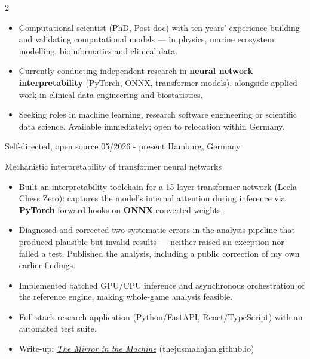 \documentclass{thejus_cv}
\begin{document}
\begin{paracol}{2}


\begin{itemize}[label=\textbullet, leftmargin=1em]
    \item Computational scientist (PhD, Post-doc) with ten years' experience building and validating computational models --- in physics, marine ecosystem modelling, bioinformatics and clinical data.
    \item Currently conducting independent research in \textbf{neural network interpretability} (PyTorch, ONNX, transformer models), alongside applied work in clinical data engineering and biostatistics.
    \item Seeking roles in machine learning, research software engineering or scientific data science. Available immediately; open to relocation within Germany.
\end{itemize}


             {Self-directed, open source}
             {05/2026 - present}
             {Hamburg, Germany}
             {Mechanistic interpretability of transformer neural networks
             \begin{itemize}\setlength{\itemsep}{0.05em}
                   \item Built an interpretability toolchain for a 15-layer transformer network (Leela Chess Zero): captures the model's internal attention during inference via \textbf{PyTorch} forward hooks on \textbf{ONNX}-converted weights.
                   \item Diagnosed and corrected two systematic errors in the analysis pipeline that produced plausible but invalid results --- neither raised an exception nor failed a test. Published the analysis, including a public correction of my own earlier findings.
                   \item Implemented batched GPU/CPU inference and asynchronous orchestration of the reference engine, making whole-game analysis feasible.
                   \item Full-stack research application (Python/FastAPI, React/TypeScript) with an automated test suite.
                   \item Write-up: \href{https://thejusmahajan.github.io/blog-lc0-attention-frame.html}{\textit{The Mirror in the Machine}} \textcolor{cvgray}{\small(thejusmahajan.github.io)}
             \end{itemize}}


\end{paracol}
\end{document}
